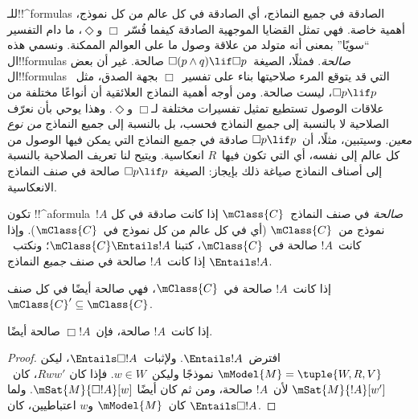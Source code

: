 \documentclass[../../../include/open-logic-section]{subfiles}
\begin{document}


\begin{explain}
  للـ!!^{formula}s الصادقة في جميع النماذج، أي الصادقة في كل عالم من
  كل نموذج، أهمية خاصة. فهي تمثل القضايا الموجهية الصادقة كيفما فُسّر
  $\Box$ و$\Diamond$، ما دام التفسير ``سويًا'' بمعنى أنه متولد من
  علاقة وصول ما على العوالم الممكنة. ونسمي هذه ال!!{formula}s
  \emph{صالحة}. فمثلًا، الصيغة~$\Box(p \land q) \lif \Box p$ صالحة.
  غير أن بعض ال!!{formula}s التي قد يتوقع المرء صلاحيتها بناء على
  تفسير~$\Box$ بجهة الصدق، مثل~$\Box p \lif p$، ليست صالحة. ومن أوجه
  أهمية النماذج العلائقية أن أنواعًا مختلفة من علاقات الوصول تستطيع
  تمثيل تفسيرات مختلفة لـ$\Box$ و$\Diamond$. وهذا يوحي بأن نعرّف
  الصلاحية لا بالنسبة إلى 
  \emph{جميع} النماذج فحسب، بل بالنسبة إلى جميع النماذج
  \emph{من نوع معين}. وسيتبين، مثلًا، أن~$\Box p \lif p$ صادقة في
  جميع النماذج التي يمكن فيها الوصول من كل عالم إلى نفسه، أي التي
  تكون فيها~$R$ انعكاسية. ويتيح لنا تعريف الصلاحية بالنسبة إلى أصناف
  النماذج صياغة ذلك بإيجاز: الصيغة~$\Box p \lif p$ صالحة في صنف
  النماذج الانعكاسية.
\end{explain}

\begin{defn}
  تكون !!^a{formula}~$!A$ \emph{صالحة} في صنف النماذج~$\mClass{C}$
  إذا كانت صادقة في كل نموذج من~$\mClass{C}$ (أي في كل عالم من كل
  نموذج في~$\mClass{C}$). وإذا كانت~$!A$ صالحة في~$\mClass{C}$، كتبنا
  $\mClass{C} \Entails !A$؛ ونكتب~$\Entails !A$ إذا كانت~$!A$ صالحة
  في صنف \emph{جميع} النماذج.
\end{defn}

\begin{prop}
  إذا كانت~$!A$ صالحة في~$\mClass{C}$، فهي صالحة أيضًا في كل صنف
  $\mClass{C}' \subseteq \mClass{C}$.
\end{prop}

\begin{prop}
  إذا كانت~$!A$ صالحة، فإن~$\Box!A$ صالحة أيضًا.
\end{prop}

\begin{proof}
  افترض~$\Entails !A$. ولإثبات~$\Entails \Box!A$، ليكن
  $\mModel{M} = \tuple{W, R, V}$ نموذجًا وليكن~$w \in W$. فإذا كان
  $Rww'$، كان~$\mSat{M}{!A}[w']$ لأن~$!A$ صالحة، ومن ثم كان أيضًا
  $\mSat{M}{\Box!A}[w]$. ولما كان~$\mModel{M}$ و$w$ اعتباطيين، كان
  $\Entails \Box!A$.
\end{proof}
\end{document}
